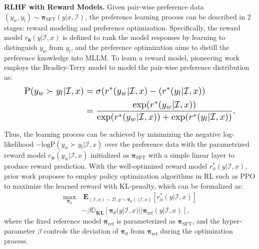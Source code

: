 \noindent \textbf{RLHF with Reward Models.}
Given pair-wise preference data $(y_w, y_l) \sim \bm{\pi}_{\mathrm{SFT}}(y|x,\mathcal{I})$, the preference learning process can be described in 2 stages: reward modeling and preference optimization. 
Specifically, the reward model $r_{\bm{\theta}}(y|\mathcal{I}, x)$ is defined to rank the model responses by learning to distinguish $y_w$ from $y_l$, and the preference optimization aims to distill the preference knowledge into MLLM. 
To learn a reward model, pioneering work \cite{rlhf} employs the Bradley-Terry model \cite{BT_model} to model the pair-wise preference distribution as:
\begin{equation}
\resizebox{.9\hsize}{!}{
\begin{math}
\begin{aligned}
    \mathrm{P}(y_w \succ  y_l|\mathcal{I}, x) & =  \sigma(r^{*}(y_w|\mathcal{I}, x)- (r^{*}(y_l|\mathcal{I}, x)) \\
     & = \frac{\mathrm{exp}(r^{*}(y_w|\mathcal{I}, x))}{\mathrm{exp}(r^{*}(y_w|\mathcal{I}, x))+\mathrm{exp}(r^{*}(y_l|\mathcal{I}, x))}.
\end{aligned}
\end{math}
}
\end{equation}

Thus, the learning process can be achieved by minimizing the negative log-likelihood $-\mathrm{logP}(y_w \succ y_l|\mathcal{I}, x)$ over the preference data with the parametrized reward model $r_{\bm{\phi}}(y_w|\mathcal{I}, x)$ initialized as $\bm{\pi}_{\mathrm{SFT}}$ with a simple linear layer to produce reward prediction. 
With the well-optimized reward model $r_{\phi}^{*}(y|\mathcal{I}, x)$, prior work \cite{rlhf} proposes to employ policy optimization algorithms in RL such as PPO \cite{PPO} to maximize the learned reward with KL-penalty, which can be formalized as:
\begin{equation}
\label{equ:ppo}
\begin{aligned}
    \underset{\bm{\pi}_{\theta}}{\text{max}} & \  \mathbf{E}_{(\mathcal{I},x) \sim \mathcal{D}, y \sim \bm{\pi}_{\theta}(\cdot|\mathcal{I}, x)} [r_{\phi}^{*}(y|\mathcal{I}, x)] \\
    & -\beta \mathbb{D}_{\mathbf{KL}}[\bm{\pi}_{\theta}(y|\mathcal{I},x)||\bm{\pi}_{\text{ref}}(y|\mathcal{I},x)], 
\end{aligned}
\end{equation}
where the fixed reference model $\bm{\pi}_{\text{ref}}$ is parameterized as $\bm{\pi}_{\text{SFT}}$, and the hyper-parameter $\beta$ controls the deviation of $\bm{\pi}_{\theta}$ from $\bm{\pi}_{\text{ref}}$ during the optimization process.

